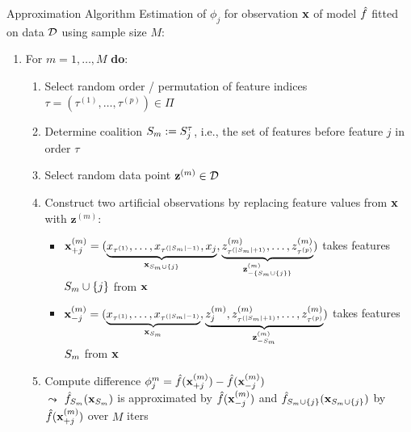 \documentclass[11pt,compress,t,notes=noshow, aspectratio=169, xcolor=table]{beamer}
\begin{document}
\begin{frame}{Approximation Algorithm }
Estimation of $\phi_j$ for observation $\xv$ of model $\fh$ fitted on data $\D$ using sample size $M$:
  \begin{enumerate}[<+->]
      \item For $m = 1, \ldots, M$ \textbf{do}:
      \begin{enumerate}
        \item Select random order / permutation of feature indices $\tau = (\tau^{(1)}, \ldots, \tau^{(p)}) \in \Pi$
        \item Determine coalition $\Sm := \Stau$, i.e., the set of features before feature $j$ in order $\tau$
        \item Select random data point $\mathbf{z}^{(m)} \in \D$%
        \item Construct two artificial observations by replacing feature values from $\xv$ with $\mathbf{z}^{(m)}$:
          \begin{itemize}
          \setlength\itemsep{.5em}
            \item %
            $ \xjp  = (\underbrace{x_{\tau^{(1)}}, \ldots, x_{\tau^{(|\Sm|-1)}}, x_{j}}_{\xv_{\Smj}}, \underbrace{z_{\tau^{(|\Sm|+1)}}^{(m)} , \ldots, z_{\tau^{(p)}}^{(m)}}_{\mathbf{z}^{(m)}_{\minusSmj}} )$
            takes features $\Smj$ from $\xv$
            \item %
            $ \xjm = (\underbrace{x_{\tau^{(1)}}, \ldots, x_{\tau^{(|\Sm|-1)}}}_{\xv_{\Sm}}, \underbrace{z_{j}^{(m)} , z_{\tau^{(|\Sm|+1)}}^{(m)} , \ldots, z_{\tau^{(p)}}^{(m)}}_{\mathbf{z}^{(m)}_{-\Sm}} )$
            takes features $\Sm$ from $\xv$
          \end{itemize}
        \item Compute difference $\phi_j^m = \fh(\xjp) - \fh(\xjm)$ \\
        $\leadsto$ $\fh_{\Sm}(\xv_{\Sm})$ is approximated by $\fh(\xv_{-j}^{(m)})$ and  $\fh_{\Smj}(\xv_{\Smj})$ by  $\fh(\xv_{+j}^{(m)})$ over $M$ iters
        \end{enumerate}
        

\end{enumerate}
\end{frame}
\end{document}
